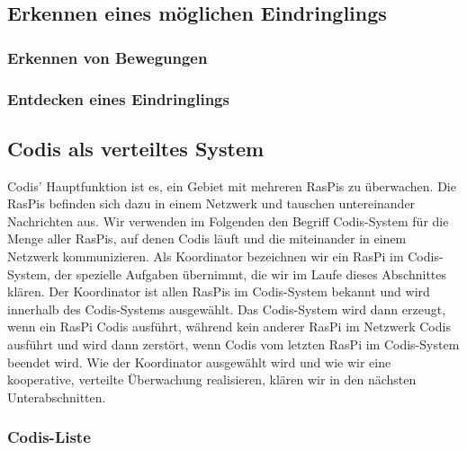 \documentclass[journal]{IEEEtran}
\begin{document}
\subsection{Erkennen eines möglichen Eindringlings}


\subsubsection{Erkennen von Bewegungen}


\subsubsection{Entdecken eines Eindringlings}


\subsection{Codis als verteiltes System}

Codis' Hauptfunktion ist es, ein Gebiet mit mehreren RasPis zu überwachen. Die RasPis befinden sich dazu in einem Netzwerk und tauschen untereinander Nachrichten aus. Wir verwenden im Folgenden den Begriff Codis-System für die Menge aller RasPis, auf denen Codis läuft und die miteinander in einem Netzwerk kommunizieren. Als Koordinator bezeichnen wir ein RasPi im Codis-System, der spezielle Aufgaben übernimmt, die wir im Laufe dieses Abschnittes klären. Der Koordinator ist allen RasPis im Codis-System bekannt und wird innerhalb des Codis-Systems ausgewählt. Das Codis-System wird dann erzeugt, wenn ein RasPi Codis ausführt, während kein anderer RasPi im Netzwerk Codis ausführt und wird dann zerstört, wenn Codis vom letzten RasPi im Codis-System beendet wird. Wie der Koordinator ausgewählt wird und wie wir eine kooperative, verteilte Überwachung realisieren, klären wir in den nächsten Unterabschnitten.

\subsubsection{Codis-Liste}
\end{document}
